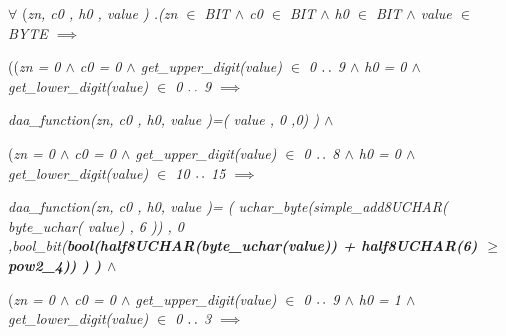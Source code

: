 \documentclass[11pt]{article}
\begin{document}
\begin{sloppypar}
\hspace*{0.20in} $\forall$ \rm (\it zn\rm , \it c0 \rm , \it h0 \rm , \it value \rm ) \rm .\rm (\it zn  $\in$  \it BIT  $\land$  \it c0  $\in$  \it BIT  $\land$  \it h0  $\in$  \it BIT  $\land$  \it value  $\in$  \it BYTE  $\implies$ 

\hspace*{0.40in}\rm (\hspace*{0.10in}\rm (\hspace*{0.10in}\it zn \rm = \rm 0  $\land$  \it c0 \rm = \rm 0  $\land$  \it get\_upper\_digit\rm (\it value\rm )  $\in$  \rm 0 $\mathbin{\ldotp\ldotp}$ \rm 9  $\land$  \it h0 \rm = \rm 0  $\land$  \it get\_lower\_digit\rm (\it value\rm )  $\in$  \rm 0 $\mathbin{\ldotp\ldotp}$ \rm 9  $\implies$ 

\hspace*{0.80in}\it daa\_function\rm (\it zn\rm , \it c0 \rm , \it h0\hspace*{0.10in}\rm , \it value \rm )\rm =\rm ( \it value \rm , \rm 0 \rm ,\rm 0\hspace*{0.10in}\rm ) \rm )  $\land$ 

\hspace*{0.60in}\rm (\hspace*{0.10in}\it zn \rm = \rm 0  $\land$  \it c0 \rm = \rm 0  $\land$  \it get\_upper\_digit\rm (\it value\rm )  $\in$  \rm 0 $\mathbin{\ldotp\ldotp}$ \rm 8  $\land$  \it h0 \rm = \rm 0  $\land$  \it get\_lower\_digit\rm (\it value\rm )  $\in$  \rm 1\rm 0 $\mathbin{\ldotp\ldotp}$ \rm 1\rm 5  $\implies$ 

\hspace*{0.80in}\it daa\_function\rm (\it zn\rm , \it c0 \rm , \it h0\hspace*{0.10in}\rm , \it value \rm )\rm = \rm ( \it uchar\_byte\rm (\it simple\_add8UCHAR\rm ( \it byte\_uchar\rm ( \it value\rm ) \rm , \rm 6 \rm )\rm ) \rm , \rm 0 \rm ,\hspace*{0.10in}\it bool\_bit\rm (\bf bool\rm (\hspace*{0.15in}\it half8UCHAR\rm (\it byte\_uchar\rm (\it value\rm )\rm ) \rm + \it half8UCHAR\rm (\rm 6\rm )  $\geq$  \it pow2\_4\rm )\rm ) \rm ) \rm )  $\land$ 

\hspace*{0.60in}\rm (\hspace*{0.10in}\it zn \rm = \rm 0  $\land$  \it c0 \rm = \rm 0  $\land$  \it get\_upper\_digit\rm (\it value\rm )  $\in$  \rm 0 $\mathbin{\ldotp\ldotp}$ \rm 9  $\land$  \it h0 \rm = \rm 1  $\land$  \it get\_lower\_digit\rm (\it value\rm )  $\in$  \rm 0 $\mathbin{\ldotp\ldotp}$ \rm 3  $\implies$ 


\end{sloppypar}
\end{document}
